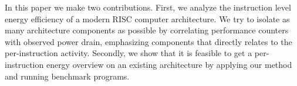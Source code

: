 In this paper we make two contributions. First, we analyze the instruction level
energy efficiency of a modern RISC computer architecture. We try to isolate as
many architecture components as possible by correlating performance counters
with observed power drain, emphasizing components that directly relates to the
per-instruction activity. Secondly, we show that it is feasible to get a
per-instruction energy overview on an existing architecture by applying our
method and running benchmark programs.



